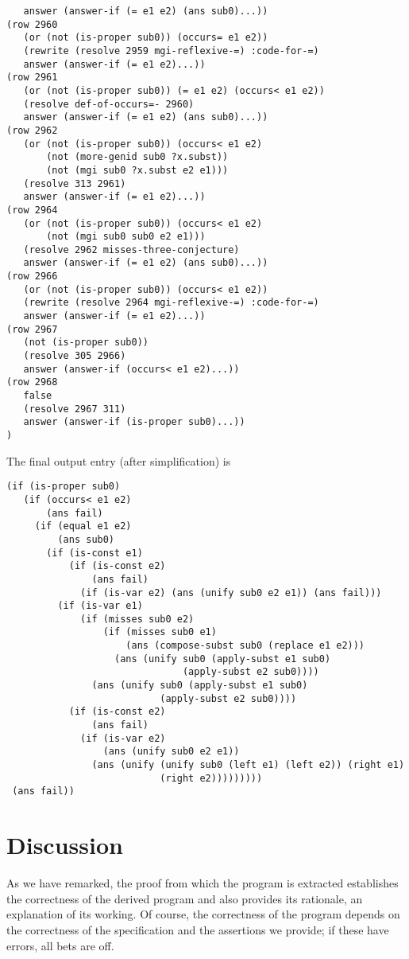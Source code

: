 \documentclass[runningheads]{llncs}
\begin{document}
\begin{verbatim}
   answer (answer-if (= e1 e2) (ans sub0)...))
(row 2960
   (or (not (is-proper sub0)) (occurs= e1 e2))
   (rewrite (resolve 2959 mgi-reflexive-=) :code-for-=)
   answer (answer-if (= e1 e2)...))
(row 2961
   (or (not (is-proper sub0)) (= e1 e2) (occurs< e1 e2))
   (resolve def-of-occurs=- 2960)
   answer (answer-if (= e1 e2) (ans sub0)...))
(row 2962
   (or (not (is-proper sub0)) (occurs< e1 e2)
       (not (more-genid sub0 ?x.subst)) 
       (not (mgi sub0 ?x.subst e2 e1)))
   (resolve 313 2961)
   answer (answer-if (= e1 e2)...))
(row 2964
   (or (not (is-proper sub0)) (occurs< e1 e2)
       (not (mgi sub0 sub0 e2 e1)))
   (resolve 2962 misses-three-conjecture)
   answer (answer-if (= e1 e2) (ans sub0)...))
(row 2966
   (or (not (is-proper sub0)) (occurs< e1 e2))
   (rewrite (resolve 2964 mgi-reflexive-=) :code-for-=)
   answer (answer-if (= e1 e2)...))
(row 2967
   (not (is-proper sub0))
   (resolve 305 2966)
   answer (answer-if (occurs< e1 e2)...))
(row 2968
   false
   (resolve 2967 311)
   answer (answer-if (is-proper sub0)...))
)
\end{verbatim}

The final output entry (after simplification)  is

\begin{verbatim}
(if (is-proper sub0)
   (if (occurs< e1 e2)
       (ans fail)
     (if (equal e1 e2)
         (ans sub0)
       (if (is-const e1)
           (if (is-const e2)
               (ans fail)
             (if (is-var e2) (ans (unify sub0 e2 e1)) (ans fail)))
         (if (is-var e1)
             (if (misses sub0 e2)
                 (if (misses sub0 e1)
                     (ans (compose-subst sub0 (replace e1 e2)))
                   (ans (unify sub0 (apply-subst e1 sub0)
                               (apply-subst e2 sub0))))
               (ans (unify sub0 (apply-subst e1 sub0)
                           (apply-subst e2 sub0))))
           (if (is-const e2)
               (ans fail)
             (if (is-var e2)
                 (ans (unify sub0 e2 e1))
               (ans (unify (unify sub0 (left e1) (left e2)) (right e1)
                           (right e2)))))))))
 (ans fail))
\end{verbatim}

\section{Discussion} As we have remarked, the proof from which the program is extracted establishes the correctness of the derived program and also provides its rationale, an explanation of its working.  Of course, the correctness of the program depends on the correctness of the specification and the assertions we provide; if these have errors, all bets are off.
\end{document}
